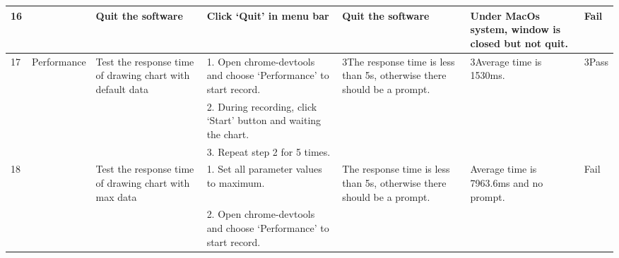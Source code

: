 \documentclass{article}
\begin{document}
\begin{longtable}{|p{10pt}|p{60pt}|p{95pt}|p{130pt}|p{60pt}|p{55pt}|p{25pt}|}
16                  &                                       & Quit the software                                                                                                         & Click ‘Quit’ in menu bar                                                                         & Quit the software                                                                                      & Under MacOs system, window is closed but not quit.        & Fail                  \\ \hline
17 & Performance          & Test the response time of drawing chart with default data                                                & 1.    Open chrome-devtools and choose ‘Performance’ to start record.                             & {3}{The response time is less than 5s, otherwise there should be a prompt.}                & {3}{Average time is 1530ms.}                  & {3}{Pass} \\ \cline{4-4}
                    &                                       &                                                                                                                           & 2.    During recording, click ‘Start’ button and waiting the chart.                              &                                                                                                        &                                                           &                       \\ \cline{4-4}
                    &                                       &                                                                                                                           & 3.    Repeat step 2 for 5 times.                                                                 &                                                                                                        &                                                           &                       \\ \cline{1-1} \cline{3-7}
{18} &                                       & {Test the response time of drawing chart with max data}                                                    & 1.    Set all parameter values to maximum.                                                       & {The response time is less than 5s, otherwise there should be a prompt.}                & {Average  time is 7963.6ms and no prompt.} & {Fail} \\ \cline{4-4}
                    &                                       &                                                                                                                           & 2.    Open chrome-devtools and choose ‘Performance’ to start record.                             &                                                                                                        &                                                           &                       \\ \cline{4-4}

\end{longtable}
\end{document}
